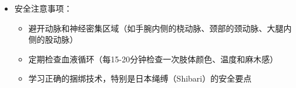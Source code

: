 \documentclass[12pt,UTF8]{ctexbook}
\begin{document}
\begin{itemize}
\begin{itemize}
\begin{itemize}
\begin{itemize}
          \item 安全要点：选择有安全扣的项圈，避免使用带锁且无钥匙的项圈；确保能插入2-3根手指
          \item 风险提示：避免压迫颈部动脉和气管，防止窒息风险
        \end{itemize}
      \item \textbf{辅助工具}：
        \begin{itemize}
        \item \textbf{束缚带}：
          \item 类型：魔术贴束缚带、带扣束缚带、可调节束缚带
          \item 安全要点：选择宽度足够的束缚带（至少5cm），避免局部压力过大；确保有快速释放功能
          \item 适用场景：初学者使用，快速捆绑，温柔场景
        \item \textbf{分腿器}：
          \item 类型：固定角度分腿器、可调节分腿器
          \item 安全要点：选择重量适中的分腿器，避免使用过重导致关节损伤；确保底部有防滑设计
          \item 风险提示：避免过度打开双腿，防止髋关节损伤
        \item \textbf{眼罩}：
          \item 类型：柔软眼罩、皮革眼罩、带填充眼罩
          \item 安全要点：确保透气性良好，避免长时间佩戴；选择有快速释放功能的眼罩
          \item 作用：增强其他感官体验，增加神秘感
        \item \textbf{口塞}：
          \item 类型：硅胶口塞、橡胶口塞、带孔口塞
          \item 安全要点：选择大小合适的口塞，确保佩戴者能正常呼吸；使用前消毒；定期检查佩戴者状态
          \item 风险提示：避免使用无孔口塞，防止窒息风险；避免长时间佩戴导致口腔肌肉疲劳
        \end{itemize}
      \end{itemize}
    \item 安全注意事项：
      \begin{itemize}
      \item 避开动脉和神经密集区域（如手腕内侧的桡动脉、颈部的颈动脉、大腿内侧的股动脉）
      \item 定期检查血液循环（每15-20分钟检查一次肢体颜色、温度和麻木感）
      \item 学习正确的捆绑技术，特别是日本绳缚（Shibari）的安全要点

\end{itemize}
\end{itemize}
\end{itemize}
\end{document}
